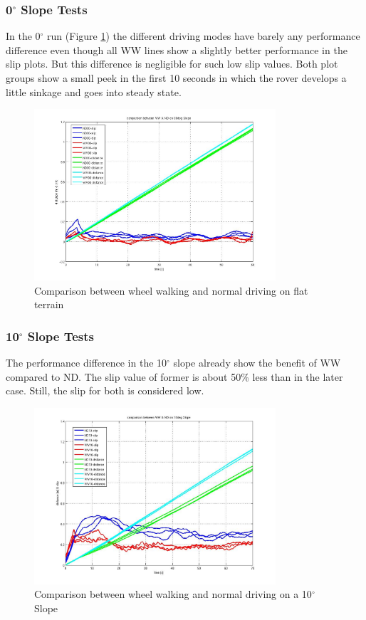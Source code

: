 \documentclass[a4paper,twocolumn]{esapub2005} %
\begin{document}
\subsubsection*{0$^{\circ}$ Slope Tests}
In the 0$^\circ$ run (Figure \ref{fig:00d}) the different driving modes have
barely any performance difference even though all WW lines show a slightly
better performance in the slip plots. But this difference is negligible for
such low slip values. Both plot groups show a small peek in the first 10
seconds in which the rover develops a little sinkage and goes into steady
state. 

\begin{figure}[b!]
    \centering
    \includegraphics[width=0.8\textwidth]{00d.jpg}
    \caption{Comparison between wheel walking and normal driving on flat terrain}
    \label{fig:00d}
\end{figure}

\subsubsection*{10$^{\circ}$ Slope Tests}
The performance difference in the 10$^\circ$ slope already show the benefit of
WW compared to ND. The slip value of former is about 50\% less than in the
later case. Still, the slip for both is considered low.

\begin{figure}[h!]
    \centering
    \includegraphics[width=0.8\textwidth]{10d.jpg}	\caption{Comparison between
    wheel walking and normal driving on a 10$^{\circ}$ Slope} \label{fig:10d}
\end{figure}
\end{document}
